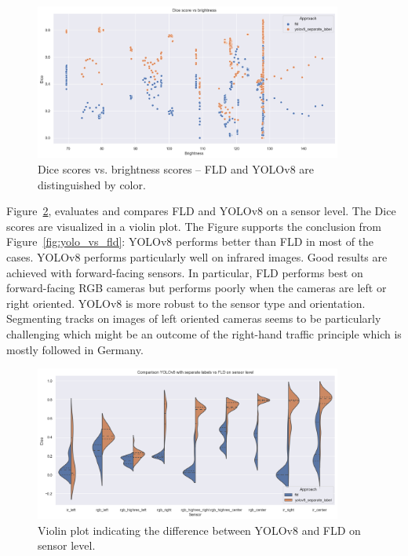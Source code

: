\documentclass[Master,MDS,english]{BASE/twbook} %
\begin{document}
\begin{figure}[h]
\centering
\includegraphics[width=0.9\textwidth]{images/results/dice_vs_brightness_nl}
\caption{Dice scores vs. brightness scores -- FLD and YOLOv8 are distinguished by color.  }
\label{fig:dice_vs_brightness}
\end{figure}



Figure~\ref{fig:yolo_models}, evaluates and compares FLD and YOLOv8 on a sensor level. 
The Dice scores are visualized in a violin plot.
The Figure supports the conclusion from Figure~\ref{fig:yolo_vs_fld}: YOLOv8 performs better than FLD in most of the cases. YOLOv8 performs particularly well on infrared images. Good results are achieved with forward-facing sensors. In particular, FLD performs best on forward-facing RGB cameras but performs poorly when the cameras are left or right oriented. YOLOv8 is more robust to the sensor type and orientation. Segmenting tracks on images of left oriented cameras seems to be particularly challenging which might be an outcome of the right-hand traffic principle which is mostly followed in Germany.


\begin{figure}[h]
\centering
\includegraphics[width=0.9\textwidth]{images/results/violin_plot_nl}
\caption{Violin plot indicating the difference between YOLOv8 and FLD on sensor level.  }
\label{fig:yolo_models}
\end{figure}
\end{document}
